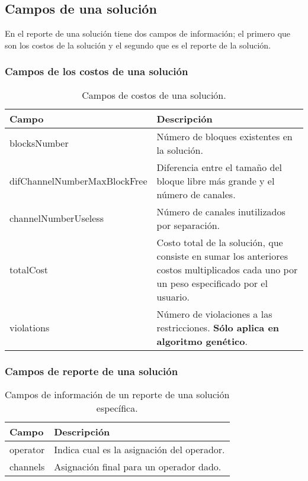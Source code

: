 \subsection{Campos de una solución}

En el reporte de una solución tiene dos campos de información; el primero que son los costos de la solución y el segundo que es el reporte de la solución.

\subsubsection{Campos de los costos de una solución}

\begin{center}
\begin{longtable}{|p{7cm}|p{9cm}|}
	\caption{Campos de costos de una solución.}\\
	\hline
	\cellcolor[gray]{0.9} \textbf{Campo} & \cellcolor[gray]{0.9}\textbf{Descripción} \\
	\hline
	blocksNumber & Número de bloques existentes en la solución.\\
	\hline
	difChannelNumberMaxBlockFree & Diferencia entre el tamaño del bloque libre más grande y el número de canales.\\
	\hline
	channelNumberUseless & Número de canales inutilizados por separación.\\
	\hline
	totalCost & Costo total de la solución, que consiste en sumar los anteriores costos multiplicados cada uno por un peso especificado por el usuario.\\
	\hline
	violations & Número de violaciones a las restricciones. \textbf{Sólo aplica en algoritmo genético}.\\
	\hline
\end{longtable}	
\end{center}

\subsubsection{Campos de reporte de una solución}

\begin{center}
\begin{longtable}{|p{7cm}|p{9cm}|}
	\caption{Campos de información de un reporte de una solución específica.}\\
	\hline
	\cellcolor[gray]{0.9} \textbf{Campo} & \cellcolor[gray]{0.9}\textbf{Descripción} \\
	\hline
	operator & Indica cual es la asignación del operador.\\
	\hline
	channels & Asignación final para un operador dado.\\
	\hline
\end{longtable}	
\end{center}

